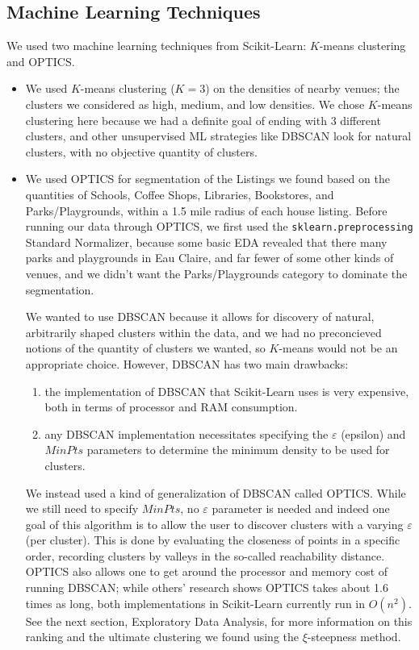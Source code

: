 \documentclass{article}
\begin{document}
\subsection{Machine Learning Techniques}
We used two machine learning techniques from Scikit-Learn: $K$-means clustering and OPTICS. %
\begin{itemize}
    \item We used $K$-means clustering ($K=3$) on the densities of nearby venues; the clusters we considered as high, medium, and low densities. We chose $K$-means clustering here because we had a definite goal of ending with 3 different clusters, and other unsupervised ML strategies like DBSCAN look for natural clusters, with no objective quantity of clusters.%
    \item We used OPTICS for segmentation of the Listings we found based on the quantities of Schools, Coffee Shops, Libraries, Bookstores, and Parks/Playgrounds, within a 1.5 mile radius of each house listing. Before running our data through OPTICS, we first used the {\tt sklearn.preprocessing} Standard Normalizer, because some basic EDA revealed that there many parks and playgrounds in Eau Claire, and far fewer of some other kinds of venues, and we didn't want the Parks/Playgrounds category to dominate the segmentation. 

        We wanted to use DBSCAN because it allows for discovery of natural, arbitrarily shaped clusters within the data, and we had no preconcieved notions of the quantity of clusters we wanted, so $K$-means would not be an appropriate choice. However, DBSCAN has two main drawbacks:
        \begin{enumerate}
            \item the implementation of DBSCAN that Scikit-Learn uses is very expensive, both in terms of processor and RAM consumption. 
            \item any DBSCAN implementation necessitates specifying the $\varepsilon$ (epsilon) and $MinPts$ parameters to determine the minimum density to be used for clusters. 
        \end{enumerate}
        We instead used a kind of generalization of DBSCAN called OPTICS. While we still need to specify $MinPts$, no $\varepsilon$ parameter is needed and indeed one goal of this algorithm is to allow the user to discover clusters with a varying $\varepsilon$ (per cluster). This is done by evaluating the closeness of points in a specific order,  recording clusters by valleys in the so-called reachability distance. OPTICS also allows one to get around the processor and memory cost of running DBSCAN; while others' research shows OPTICS takes about 1.6 times as long, both implementations in Scikit-Learn currently run in $O(n^2)$. See the next section, Exploratory Data Analysis, for more information on this ranking and the ultimate clustering we found using the $\xi$-steepness method. 


\end{itemize}
\end{document}
